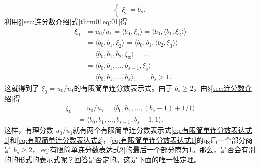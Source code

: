 \begin{theorem}
\begin{equation}
\begin{cases}
			\xi_s = b_s.
		\end{cases}
	\end{equation}
	利用\S \ref{sec:连分数介绍}式\eqref{thrm01eq:01}得
	\begin{align}
		\xi_0 & = u_0 / u_1 = \langle b_0, \xi_1 \rangle = \langle b_0, \langle b_1, \xi_2 \rangle \rangle \nonumber \\
		      & = \langle b_0, b_1, \xi_2 \rangle = \langle b_0, b_1, \langle b_2, \xi_3 \rangle \rangle   \nonumber \\
		      & = \langle b_0, b_1, b_2, \xi_3 \rangle = \dots \nonumber                                             \\
		      & = \langle b_0, b_1, \dots, b_{s-1}, \xi_s \rangle \nonumber                                          \\
		      & = \langle b_0, b_1, \dots, b_s \rangle, \qquad b_s > 1. \label{eq:有限简单连分数表达式1}
	\end{align}
	这就得到了 \( \xi_0 = u_0 / u_1 \)的有限简单连分数表示式。由于 \( b_s \geqslant 2 \)，由\S \ref{sec:连分数介绍}得
	\begin{align}
		\xi_0 & = u_0 / u_1 = \langle b_0, b_1, \dots, (b_s - 1) + 1/1 \rangle\nonumber                  \\
		      & = \langle b_0, b_1, \dots, b_{s-1}, b_s - 1, 1 \rangle. \label{eq:有限简单连分数表达式2}
	\end{align}
	这样，有理分数 \( u_0 / u_1
	\)就有两个有限简单连分数表示式\eqref{eq:有限简单连分数表达式1}和\eqref{eq:有限简单连分数表达式2}，\eqref{eq:有限简单连分数表达式1}的最后一个部分商是
	\( b_s \geqslant 2
	\)，\eqref{eq:有限简单连分数表达式2}的最后一个部分商为1。那么，是否会有别的的形式的表示式呢？回答是否定的。这是下面的唯一性定理。
\end{theorem}

